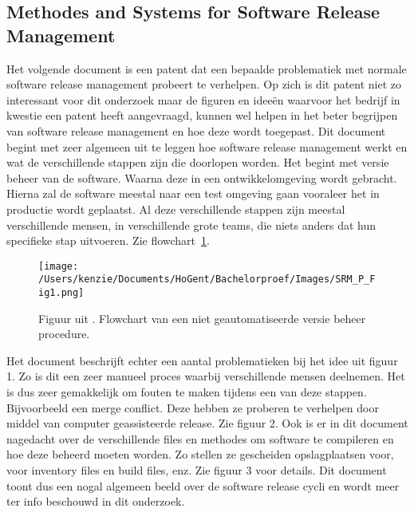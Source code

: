 \subsection{Methodes and Systems for Software Release Management}
Het volgende document \autocite{Barshefsky2005} is een patent dat een bepaalde problematiek met normale software release management probeert te verhelpen. Op zich is dit patent niet zo interessant voor dit onderzoek maar de figuren en ideeën waarvoor het bedrijf in kwestie een patent heeft aangevraagd, kunnen wel helpen in het beter begrijpen van software release management en hoe deze wordt toegepast.
\newline
\newline
Dit document \autocite{Barshefsky2005} begint met zeer algemeen uit te leggen hoe software release management werkt en wat de verschillende stappen zijn die doorlopen worden. Het begint met versie beheer van de software. Waarna deze in een ontwikkelomgeving wordt gebracht. Hierna zal de software meestal naar een test omgeving gaan vooraleer het in productie wordt geplaatst. Al deze verschillende stappen zijn meestal verschillende mensen, in verschillende grote teams, die niets anders dat hun specifieke stap uitvoeren. Zie flowchart~\ref{fig:FL_fig1}.
\begin{figure}[H]
    \centering
    \texttt{[image: /Users/kenzie/Documents/HoGent/Bachelorproef/Images/SRM\_P\_Fig1.png]}
    \caption{Figuur uit \autocite{Barshefsky2005}. Flowchart van een niet geautomatiseerde versie beheer procedure.}
    \label{fig:FL_fig1}
\end{figure}
Het document \autocite{Barshefsky2005} beschrijft echter een aantal problematieken bij het idee uit figuur 1. Zo is dit een zeer manueel proces waarbij verschillende mensen deelnemen. Het is dus zeer gemakkelijk om fouten te maken tijdens een van deze stappen. Bijvoorbeeld een merge conflict. Deze hebben ze proberen te verhelpen door middel van computer geassisteerde release. Zie figuur 2. Ook is er in dit document nagedacht over de verschillende files en methodes om software te compileren en hoe deze beheerd moeten worden. Zo stellen ze gescheiden opslagplaatsen voor, voor inventory files en build files, enz. Zie figuur 3 voor details.
\newline
\newline
Dit document \autocite{Barshefsky2005} toont dus een nogal algemeen beeld over de software release cycli en wordt meer ter info beschouwd in dit onderzoek.
\newline
\newline
